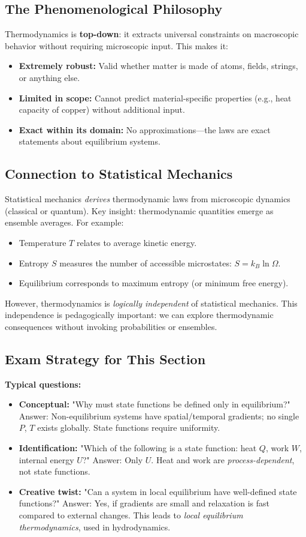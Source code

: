 \documentclass[9pt,twocoloumn]{article}
\begin{document}
\subsection{The Phenomenological Philosophy}
Thermodynamics is \textbf{top-down}: it extracts universal constraints on macroscopic behavior without requiring microscopic input. This makes it:
\begin{itemize}
    \item \textbf{Extremely robust:} Valid whether matter is made of atoms, fields, strings, or anything else.
    \item \textbf{Limited in scope:} Cannot predict material-specific properties (e.g., heat capacity of copper) without additional input.
    \item \textbf{Exact within its domain:} No approximations—the laws are exact statements about equilibrium systems.
\end{itemize}

\subsection{Connection to Statistical Mechanics}
Statistical mechanics \emph{derives} thermodynamic laws from microscopic dynamics (classical or quantum). Key insight: thermodynamic quantities emerge as ensemble averages. For example:
\begin{itemize}
    \item Temperature $T$ relates to average kinetic energy.
    \item Entropy $S$ measures the number of accessible microstates: $S = k_B \ln \Omega$.
    \item Equilibrium corresponds to maximum entropy (or minimum free energy).
\end{itemize}

However, thermodynamics is \emph{logically independent} of statistical mechanics. This independence is pedagogically important: we can explore thermodynamic consequences without invoking probabilities or ensembles.

\subsection{Exam Strategy for This Section}
\textbf{Typical questions:}
\begin{itemize}
    \item \textbf{Conceptual:} "Why must state functions be defined only in equilibrium?" Answer: Non-equilibrium systems have spatial/temporal gradients; no single $P$, $T$ exists globally. State functions require uniformity.
    \item \textbf{Identification:} "Which of the following is a state function: heat $Q$, work $W$, internal energy $U$?" Answer: Only $U$. Heat and work are \emph{process-dependent}, not state functions.
    \item \textbf{Creative twist:} "Can a system in local equilibrium have well-defined state functions?" Answer: Yes, if gradients are small and relaxation is fast compared to external changes. This leads to \emph{local equilibrium thermodynamics}, used in hydrodynamics.
\end{itemize}
\end{document}
